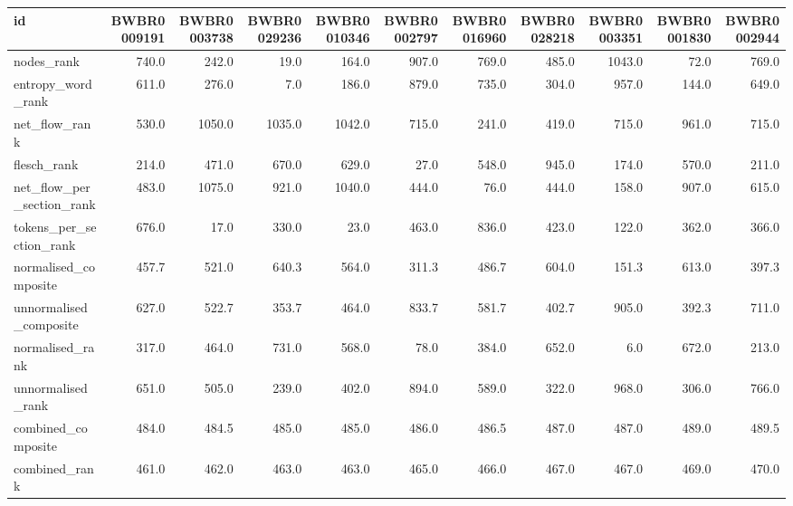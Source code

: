 \begin{tabular}{lrrrrrrrrrr}
\toprule
id & BWBR0009191 & BWBR0003738 & BWBR0029236 & BWBR0010346 & BWBR0002797 & BWBR0016960 & BWBR0028218 & BWBR0003351 & BWBR0001830 & BWBR0002944 \\
\midrule
nodes\_rank & 740.0 & 242.0 & 19.0 & 164.0 & 907.0 & 769.0 & 485.0 & 1043.0 & 72.0 & 769.0 \\
\cline{1-11}
entropy\_word\_rank & 611.0 & 276.0 & 7.0 & 186.0 & 879.0 & 735.0 & 304.0 & 957.0 & 144.0 & 649.0 \\
\cline{1-11}
net\_flow\_rank & 530.0 & 1050.0 & 1035.0 & 1042.0 & 715.0 & 241.0 & 419.0 & 715.0 & 961.0 & 715.0 \\
\cline{1-11}
flesch\_rank & 214.0 & 471.0 & 670.0 & 629.0 & 27.0 & 548.0 & 945.0 & 174.0 & 570.0 & 211.0 \\
\cline{1-11}
net\_flow\_per\_section\_rank & 483.0 & 1075.0 & 921.0 & 1040.0 & 444.0 & 76.0 & 444.0 & 158.0 & 907.0 & 615.0 \\
\cline{1-11}
tokens\_per\_section\_rank & 676.0 & 17.0 & 330.0 & 23.0 & 463.0 & 836.0 & 423.0 & 122.0 & 362.0 & 366.0 \\
\cline{1-11}
normalised\_composite & 457.7 & 521.0 & 640.3 & 564.0 & 311.3 & 486.7 & 604.0 & 151.3 & 613.0 & 397.3 \\
\cline{1-11}
unnormalised\_composite & 627.0 & 522.7 & 353.7 & 464.0 & 833.7 & 581.7 & 402.7 & 905.0 & 392.3 & 711.0 \\
\cline{1-11}
normalised\_rank & 317.0 & 464.0 & 731.0 & 568.0 & 78.0 & 384.0 & 652.0 & 6.0 & 672.0 & 213.0 \\
\cline{1-11}
unnormalised\_rank & 651.0 & 505.0 & 239.0 & 402.0 & 894.0 & 589.0 & 322.0 & 968.0 & 306.0 & 766.0 \\
\cline{1-11}
combined\_composite & 484.0 & 484.5 & 485.0 & 485.0 & 486.0 & 486.5 & 487.0 & 487.0 & 489.0 & 489.5 \\
\cline{1-11}
combined\_rank & 461.0 & 462.0 & 463.0 & 463.0 & 465.0 & 466.0 & 467.0 & 467.0 & 469.0 & 470.0 \\
\cline{1-11}
\bottomrule
\end{tabular}
